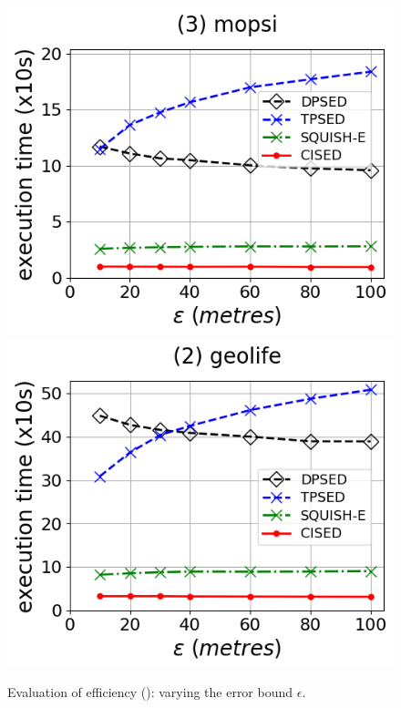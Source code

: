 \begin{figure}[tb!]
	\includegraphics[scale=0.315]{Figures/Exp-SED-time-epsilon-mopsi.png}	\hspace{1ex}
	\includegraphics[scale=0.315]{Figures/Exp-SED-time-epsilon-geolife.png}	\hspace{1ex}
	\vspace{-2.5ex}
	\caption{\small Evaluation of efficiency (\sed): varying the error bound $\epsilon$.}\label{fig:time-epsilon-sed}
	\vspace{-1ex}
\end{figure}

